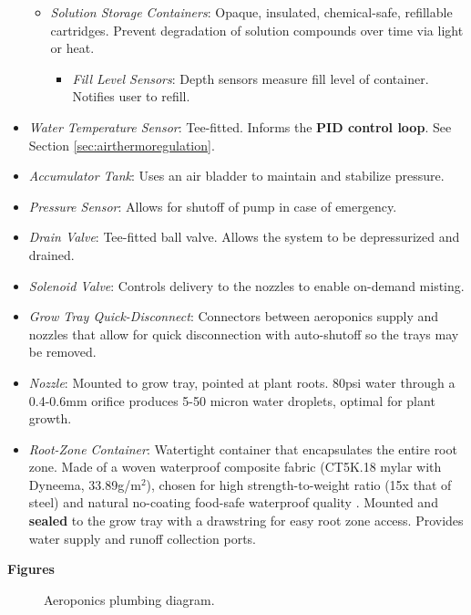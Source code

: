 \begin{itemize}
\begin{itemize}
        \item \textit{Solution Storage Containers}: Opaque, insulated, chemical-safe, refillable cartridges. Prevent degradation of solution compounds over time via light or heat.
        \begin{itemize}
            \item \textit{Fill Level Sensors}: Depth sensors measure fill level of container. Notifies user to refill.
        \end{itemize}
    \end{itemize}
    \item \textit{Water Temperature Sensor}: Tee-fitted. Informs the \textbf{PID control loop}. See Section \ref{sec:airthermoregulation}.
    \item \textit{Accumulator Tank}: Uses an air bladder to maintain and stabilize pressure.
    \item \textit{Pressure Sensor}: Allows for shutoff of pump in case of emergency.
    \item \textit{Drain Valve}: Tee-fitted ball valve. Allows the system to be depressurized and drained.
    \item \textit{Solenoid Valve}: Controls delivery to the nozzles to enable on-demand misting.
    \item \textit{Grow Tray Quick-Disconnect}: Connectors between aeroponics supply and nozzles that allow for quick disconnection with auto-shutoff so the trays may be removed.
    \item \textit{Nozzle}: Mounted to grow tray, pointed at plant roots. 80psi water through a 0.4-0.6mm orifice produces 5-50 micron water droplets, optimal for plant growth.
    \item \textit{Root-Zone Container}: Watertight container that encapsulates the entire root zone. Made of a woven waterproof composite fabric (CT5K.18 mylar with Dyneema, 33.89g/m${}^2$), chosen for high strength-to-weight ratio (15x that of steel) and natural no-coating food-safe waterproof quality \cite{dyneema}. Mounted and \textbf{sealed} to the grow tray with a drawstring for easy root zone access. Provides water supply and runoff collection ports.
\end{itemize}

\textbf{Figures}

\begin{figure}[h!]
    \centering
    \caption{Aeroponics plumbing diagram.}
    \label{fig:aeroponics_plumbing}
\end{figure}

